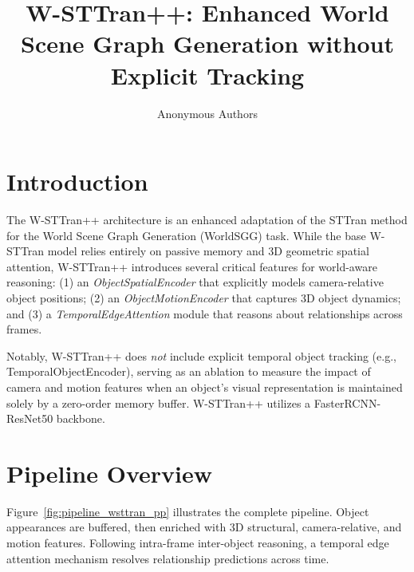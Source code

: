 \documentclass{article}
\title{W-STTran++: Enhanced World Scene Graph Generation without Explicit Tracking}
\author{Anonymous Authors}
\begin{document}
\maketitle

\section{Introduction}
\label{sec:intro}

The W-STTran++ architecture is an enhanced adaptation of the STTran method for the World Scene Graph Generation (WorldSGG) task. While the base W-STTran model relies entirely on passive memory and 3D geometric spatial attention, W-STTran++ introduces several critical features for world-aware reasoning: (1) an \emph{ObjectSpatialEncoder} that explicitly models camera-relative object positions; (2) an \emph{ObjectMotionEncoder} that captures 3D object dynamics; and (3) a \emph{TemporalEdgeAttention} module that reasons about relationships across frames. 

Notably, W-STTran++ does \emph{not} include explicit temporal object tracking (e.g., TemporalObjectEncoder), serving as an ablation to measure the impact of camera and motion features when an object's visual representation is maintained solely by a zero-order memory buffer. W-STTran++ utilizes a FasterRCNN-ResNet50 backbone.

\section{Pipeline Overview}
\label{sec:pipeline}

Figure~\ref{fig:pipeline_wsttran_pp} illustrates the complete pipeline. Object appearances are buffered, then enriched with 3D structural, camera-relative, and motion features. Following intra-frame inter-object reasoning, a temporal edge attention mechanism resolves relationship predictions across time.
\end{document}
